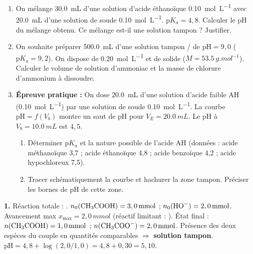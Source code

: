 \documentclass[11pt]{article}
\begin{document}
\begin{exercice}
\begin{enumerate}
\item On mélange \SI{30,0}{mL} d'une solution d'acide éthanoïque \SI{0,10}{mol.L^{-1}} avec \SI{20,0}{mL} d'une solution de soude \SI{0,10}{mol.L^{-1}}. $\text{p}K_a = 4,8$. Calculer le pH du mélange obtenu. Ce mélange est-il une solution tampon ? Justifier.
\item On souhaite préparer \SI{500,0}{mL} d'une solution tampon / de $\text{pH} = 9,0$ ($\text{p}K_a = 9,2$). On dispose de  \SI{0,20}{mol.L^{-1}} et de  solide ($M = \SI{53,5}{g.mol^{-1}}$). Calculer le volume de solution d'ammoniac et la masse de chlorure d'ammonium à dissoudre.
\item \textbf{Épreuve pratique :} On dose \SI{20,0}{mL} d'une solution d'acide faible AH (\SI{0,10}{mol.L^{-1}}) par une solution de soude \SI{0,10}{mol.L^{-1}}. La courbe $\text{pH} = f(V_b)$ montre un saut de pH pour $V_E = \SI{20,0}{mL}$. Le pH à $V_b = \SI{10,0}{mL}$ est $4,5$.
\begin{enumerate}
\item Déterminer $\text{p}K_a$ et la nature possible de l'acide AH (données : acide méthanoïque 3,7 ; acide éthanoïque 4,8 ; acide benzoïque 4,2 ; acide hypochloreux 7,5).
\item Tracer schématiquement la courbe et hachurer la zone tampon. Préciser les bornes de pH de cette zone.
\end{enumerate}
\end{enumerate}
\end{exercice}

\begin{corrige}[Exercice 1]
\textbf{1.} Réaction totale : .
$n_0(\ce{CH3COOH}) = 3,0\,\si{mmol}$ ; $n_0(\ce{HO-}) = 2,0\,\si{mmol}$.
Avancement max $x_{\max} = 2,0\,\si{mmol}$ (réactif limitant : ).
État final : $n(\ce{CH3COOH}) = 1,0\,\si{mmol}$ ; $n(\ce{CH3COO-}) = 2,0\,\si{mmol}$.
Présence des deux espèces du couple en quantités comparables $\Rightarrow$ \textbf{solution tampon}.
$\text{pH} = 4,8 + \log(2,0/1,0) = 4,8 + 0,30 = \boxed{5,10}$.
\end{corrige}
\end{document}
